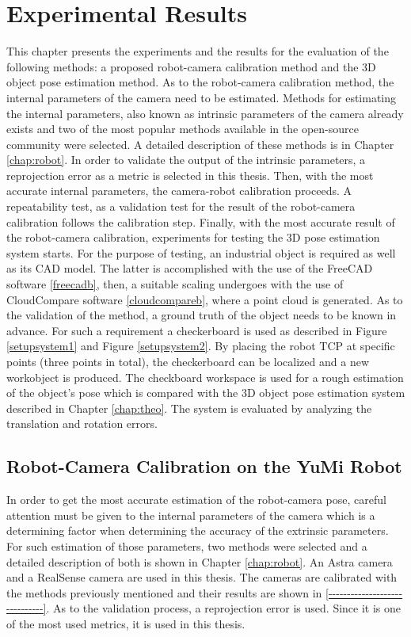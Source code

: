 
\chapter{Experimental Results}
\label{chap:exp}

This chapter presents the experiments and the results for the evaluation of the following methods: a proposed robot-camera calibration method and the 3D object pose estimation method. As to the robot-camera calibration method, the internal parameters of the camera need to be estimated. Methods for estimating the internal parameters, also known as intrinsic parameters of the camera already exists and two of the most popular methods available in the open-source community were selected. A detailed description of these methods is in Chapter \ref{chap:robot}. In order to validate the output of the intrinsic parameters, a reprojection error as a metric is selected in this thesis. Then, with the most accurate internal parameters, the camera-robot calibration proceeds. A repeatability test, as a validation test for the result of the robot-camera calibration follows the calibration step. Finally, with the most accurate result of the robot-camera calibration, experiments for testing the 3D pose estimation system starts. For the purpose of testing, an industrial object is required as well as its CAD model. The latter is accomplished with the use of the FreeCAD software \ref{freecadb}, then, a suitable scaling undergoes with the use of CloudCompare software \ref{cloudcompareb}, where a point cloud is generated. As to the validation of the method, a ground truth of the object needs to be known in advance. For such a requirement a checkerboard is used as described in Figure \ref{setupsystem1} and Figure \ref{setupsystem2}. By placing the robot TCP at specific points (three points in total), the checkerboard can be localized and a new workobject is produced. The checkboard workspace is used for a rough estimation of the object's pose which is compared with the 3D object pose estimation system described in Chapter \ref{chap:theo}. The system is evaluated by analyzing the translation and rotation errors. 


\section{Robot-Camera Calibration on the YuMi Robot}

In order to get the most accurate estimation of the robot-camera pose, careful attention must be given to the internal parameters of the camera which is a determining factor when determining the accuracy of the extrinsic parameters. For such estimation of those parameters, two methods were selected and a detailed description of both is shown in Chapter \ref{chap:robot}. An Astra camera and a RealSense camera are used in this thesis. The cameras are calibrated with the methods previously mentioned and their results are shown in \ref{------------------------------}. As to the validation process, a reprojection error is used. Since it is one of the most used metrics,  it is used in this thesis. 

